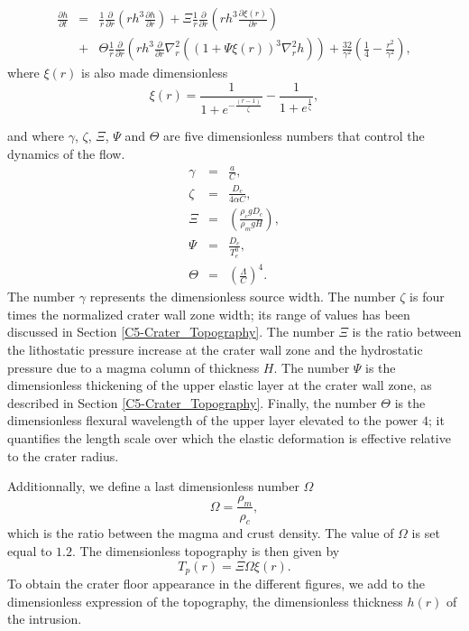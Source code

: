 \begin{eqnarray}
  \frac{\partial h}{\partial t}&=&\frac{1}{r} \frac{\partial}{\partial r}\left (rh^{3} \frac{\partial h}{\partial r} \right)+ \Xi \frac{1}{r} \frac{\partial}{\partial r}\left ( rh^{3}\frac{\partial \xi(r)}{\partial r}\right )\nonumber\\
                               &+&\Theta \frac{1}{r}\frac{\partial}{\partial r}\left ( rh^{3} \frac{\partial}{\partial r} \nabla^{2}_{r}\left ((1+\Psi \xi(r))^{3}\nabla^{2}_{r}h \right )\right)+ \frac{32}{\gamma^{2}} \left(\frac{1}{4}-\frac{r^{2}}{\gamma^{2}}\right),
                                   \label{C5-eq21}
\end{eqnarray}
where $\xi(r)$ is also made dimensionless
\begin{equation}
  \xi(r)=\frac{1}{1+e^{-\frac{(r-1)}{\zeta}}}-\frac{1}{1+e^{\frac{1}{\zeta}}},\label{C5-eqqqq}
\end{equation}

and  where $\gamma$,  $\zeta$,  $\Xi$, $\Psi$  and  $\Theta$ are  five
dimensionless numbers that control the dynamics of the flow.
\begin{eqnarray}
  \label{C5-Dimensionless1}
  \gamma&=&\frac{a}{C}, \label{C5-n1}\\
  \zeta&=&\frac{D_c}{4\alpha C},\label{C5-n2}\\
  \Xi&=& \left(\frac{\rho_{c}gD_{c}}{\rho_{m}gH}\right ),\label{C5-n3}\\
  \Psi&=&\frac{D_{c}}{T_{e}^0},\label{C5-n4}\\
  \Theta&=&\left ( \frac{\Lambda}{C} \right )^{4}.\label{C5-n5} 
\end{eqnarray}
The  number $\gamma$  represents the  dimensionless source  width. The
number $\zeta$  is four times  the normalized crater wall  zone width;
its    range   of    values    has   been    discussed   in    Section
\ref{C5-Crater_Topography}.  The number $\Xi$ is the ratio between the
lithostatic  pressure  increase  at  the  crater  wall  zone  and  the
hydrostatic  pressure due  to a  magma column  of thickness  $H$.  The
number $\Psi$  is the  dimensionless thickening  of the  upper elastic
layer   at   the  crater   wall   zone,   as  described   in   Section
\ref{C5-Crater_Topography}.   Finally,  the  number  $\Theta$  is  the
dimensionless flexural wavelength  of the upper layer  elevated to the
power  $4$; it  quantifies the  length  scale over  which the  elastic
deformation is effective relative to the crater radius.
	
Additionnally, we define a last dimensionless number $\Omega$
\begin{equation}
  \Omega=\frac{\rho_m}{\rho_c},
\end{equation}
which is the  ratio between the magma and crust  density. The value of
$\Omega$ is set  equal to $1.2$. The dimensionless  topography is then
given by
\begin{equation}
  T_p(r)=\Xi\Omega\xi(r).
  \label{C5-TopoFinal}
\end{equation}
To obtain the crater floor appearance in the different figures, we add
to the  dimensionless expression of the  topography, the dimensionless
thickness $h(r)$ of the intrusion.
	 
